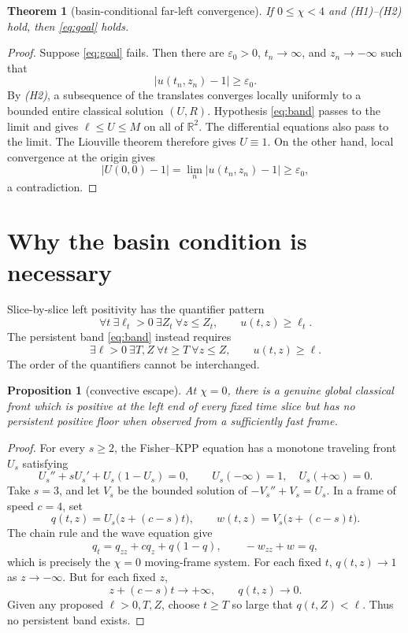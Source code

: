 \documentclass[11pt]{article}
\newcommand{\R}{\mathbb{R}}
\newcommand{\abs}[1]{\left\lvert #1\right\rvert}
\newtheorem{theorem}{Theorem}
\newtheorem{proposition}{Proposition}
\begin{document}
\begin{theorem}[basin-conditional far-left convergence]
If \(0\le\chi<4\) and \emph{(H1)--(H2)} hold, then
\eqref{eq:goal} holds.
\end{theorem}

\begin{proof}
Suppose \eqref{eq:goal} fails.  Then there are
\(\varepsilon_0>0\), \(t_n\to\infty\), and \(z_n\to-\infty\) such that
\[
 \abs{u(t_n,z_n)-1}\ge\varepsilon_0.
\]
By \emph{(H2)}, a subsequence of the translates converges locally uniformly
to a bounded entire classical solution \((U,R)\).  Hypothesis
\eqref{eq:band} passes to the limit and gives
\(\ell\le U\le M\) on all of \(\R^2\).  The differential equations also
pass to the limit.  The Liouville theorem therefore gives \(U\equiv1\).
On the other hand, local convergence at the origin gives
\[
 \abs{U(0,0)-1}
 =\lim_n\abs{u(t_n,z_n)-1}
 \ge\varepsilon_0,
\]
a contradiction.
\end{proof}

\section{Why the basin condition is necessary}

Slice-by-slice left positivity has the quantifier pattern
\[
 \forall t\ \exists\ell_t>0\ \exists Z_t\
 \forall z\le Z_t,\qquad u(t,z)\ge\ell_t.
\]
The persistent band \eqref{eq:band} instead requires
\[
 \exists\ell>0\ \exists T,Z\
 \forall t\ge T\ \forall z\le Z,\qquad u(t,z)\ge\ell.
\]
The order of the quantifiers cannot be interchanged.

\begin{proposition}[convective escape]
At \(\chi=0\), there is a genuine global classical front which is positive
at the left end of every fixed time slice but has no persistent positive
floor when observed from a sufficiently fast frame.
\end{proposition}

\begin{proof}
For every \(s\ge2\), the Fisher--KPP equation has a monotone traveling front
\(U_s\) satisfying
\[
 U_s''+sU_s'+U_s(1-U_s)=0,\qquad
 U_s(-\infty)=1,\quad U_s(+\infty)=0.
\]
Take \(s=3\), and let \(V_s\) be the bounded solution of
\(-V_s''+V_s=U_s\).  In a frame of speed \(c=4\), set
\[
 q(t,z)=U_s\bigl(z+(c-s)t\bigr),\qquad
 w(t,z)=V_s\bigl(z+(c-s)t\bigr).
\]
The chain rule and the wave equation give
\[
 q_t=q_{zz}+cq_z+q(1-q),\qquad -w_{zz}+w=q,
\]
which is precisely the \(\chi=0\) moving-frame system.  For each fixed
\(t\), \(q(t,z)\to1\) as \(z\to-\infty\).  But for each fixed \(z\),
\[
 z+(c-s)t\to+\infty,\qquad q(t,z)\to0.
\]
Given any proposed \(\ell>0,T,Z\), choose \(t\ge T\) so large that
\(q(t,Z)<\ell\).  Thus no persistent band exists.
\end{proof}
\end{document}
